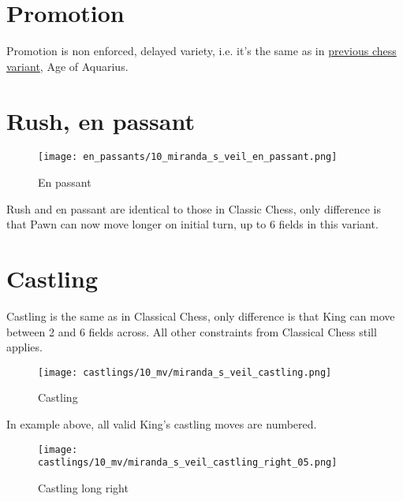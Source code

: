 \section*{Promotion}

Promotion is non enforced, delayed variety, i.e. it's the same as in
\hyperref[sec:Age of Aquarius/Promotion]{previous chess variant}, Age of Aquarius.

\clearpage %

\section*{Rush, en passant}

\noindent
\begin{wrapfigure}{l}{0.4\textwidth}
\centering
\texttt{[image: en\_passants/10\_miranda\_s\_veil\_en\_passant.png]}
\caption{En passant}
\label{fig:10_miranda_s_veil_en_passant}
\end{wrapfigure}
Rush and en passant are identical to those in Classic Chess, only difference
is that Pawn can now move longer on initial turn, up to 6 fields in this
variant.

\clearpage %

\section*{Castling}

Castling is the same as in Classical Chess, only difference is that King can move between 2 and 6 fields across.
All other constraints from Classical Chess still applies.

\noindent
\begin{figure}[!h]
\texttt{[image: castlings/10\_mv/miranda\_s\_veil\_castling.png]}
\caption{Castling}
\label{fig:miranda_s_veil_castling}
\end{figure}

In example above, all valid King's castling moves are numbered.

\noindent
\begin{figure}[!h]
\texttt{[image: castlings/10\_mv/miranda\_s\_veil\_castling\_right\_05.png]}
\caption{Castling long right}
\label{fig:miranda_s_veil_castling_right_05}
\end{figure}


